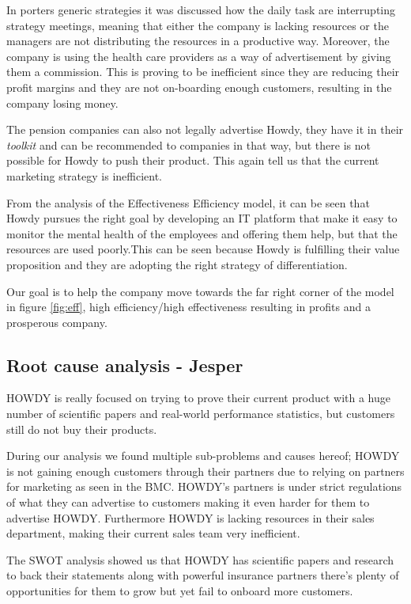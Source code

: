 \noindent In porters generic strategies it was discussed how the daily task are interrupting strategy meetings, meaning that either the company is lacking resources or the managers are not distributing the resources in a productive way. Moreover, the company is using the health care providers as a way of advertisement by giving them a commission. This is proving to be inefficient since they are reducing their profit margins and they are not on-boarding enough customers, resulting in the company losing money.

\noindent The pension companies can also not legally advertise Howdy, they have it in their \textit{toolkit} and can be recommended to companies in that way, but there is not possible for Howdy to push their product. This again tell us that the current marketing strategy is inefficient. 

\noindent From the analysis of the Effectiveness Efficiency model, it can be seen that Howdy pursues the right goal by developing an IT platform that make it easy to monitor the mental health of the employees and offering them help, but that the resources
are used poorly.This can be seen because Howdy is fulfilling their value proposition and they are adopting the right strategy of differentiation.

\noindent Our goal is to help the company move towards the far right corner of the model in figure \ref{fig:eff}, high efficiency/high effectiveness resulting in profits and a prosperous company. 



\subsection{Root cause analysis - Jesper}
HOWDY is really focused on trying to prove their current product with a huge number of scientific papers and real-world performance statistics, but customers still do not buy their products. 

During our analysis we found multiple sub-problems and causes hereof; HOWDY is not gaining enough customers through their partners due to relying on partners for marketing as seen in the BMC. HOWDY's partners is under strict regulations of what they can advertise to customers making it even harder for them to advertise HOWDY. Furthermore HOWDY is lacking resources in their sales department, making their current sales team very inefficient.

The SWOT analysis showed us that HOWDY has scientific papers and research to back their statements along with powerful insurance partners there’s plenty of opportunities for them to grow but yet fail to onboard more customers.

